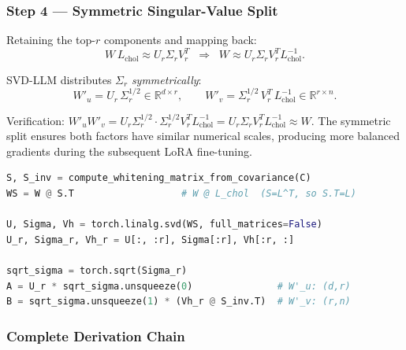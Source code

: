 \documentclass[11pt,a4paper]{article}
\newcommand{\Rbb}{\mathbb{R}}
\theoremstyle{remark}
\begin{document}
\subsubsection*{Step 4 --- Symmetric Singular-Value Split}

Retaining the top-$r$ components and mapping back:
\begin{equation}
  W\,L_{\text{chol}} \approx U_r\Sigma_r V_r^T
  \;\;\Longrightarrow\;\;
  W \approx U_r\Sigma_r V_r^T L_{\text{chol}}^{-1}.
\end{equation}

SVD-LLM distributes $\Sigma_r$ \emph{symmetrically}:
\begin{equation}
  \boxed{
    W'_u = U_r\,\Sigma_r^{1/2}\in\Rbb^{d\times r},
    \qquad
    W'_v = \Sigma_r^{1/2}\,V_r^T\,L_{\text{chol}}^{-1}\in\Rbb^{r\times n}.
  }
\end{equation}

Verification: $W'_u W'_v = U_r\Sigma_r^{1/2}\cdot\Sigma_r^{1/2}V_r^T
L_{\text{chol}}^{-1} = U_r\Sigma_r V_r^T L_{\text{chol}}^{-1} \approx W$.
The symmetric split ensures both factors have similar numerical scales,
producing more balanced gradients during the subsequent LoRA fine-tuning.

\begin{lstlisting}[language=Python, caption={Core whitening SVD implementation.}]
S, S_inv = compute_whitening_matrix_from_covariance(C)
WS = W @ S.T                   # W @ L_chol  (S=L^T, so S.T=L)

U, Sigma, Vh = torch.linalg.svd(WS, full_matrices=False)
U_r, Sigma_r, Vh_r = U[:, :r], Sigma[:r], Vh[:r, :]

sqrt_sigma = torch.sqrt(Sigma_r)
A = U_r * sqrt_sigma.unsqueeze(0)               # W'_u: (d,r)
B = sqrt_sigma.unsqueeze(1) * (Vh_r @ S_inv.T)  # W'_v: (r,n)
\end{lstlisting}

\subsubsection*{Complete Derivation Chain}
\end{document}
